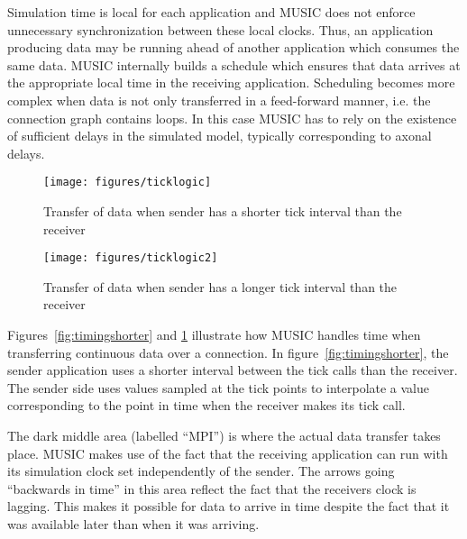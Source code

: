 \documentclass[a4paper]{report}
\begin{document}
Simulation time is local for each application
and MUSIC does not enforce unnecessary synchronization between these
local clocks.  Thus, an application producing data may be running
ahead of another application which consumes the same data.  MUSIC
internally builds a schedule which ensures that data arrives at the
appropriate local time in the receiving application.  Scheduling
becomes more complex when data is not only transferred in a
feed-forward manner, i.e. the connection graph contains loops.  In
this case MUSIC has to rely on the existence of sufficient delays in
the simulated model, typically corresponding to axonal
delays.

\begin{figure}
  \begin{center}
    \begin{minipage}{0.45\textwidth}
      \texttt{[image: figures/ticklogic]}
      \caption[Timing of data transfer, slowdown]{\label{fig:timingshorter}
        Transfer of data when sender has a shorter
        tick interval than the receiver}
    \end{minipage}
    \hfill
    \begin{minipage}{0.45\textwidth}
      \texttt{[image: figures/ticklogic2]}
      \caption[Timing of data transfer, speedup]{\label{fig:timinglonger}
        Transfer of data when sender has a longer
        tick interval than the receiver}
    \end{minipage}
  \end{center}
\end{figure}

Figures~\ref{fig:timingshorter} and \ref{fig:timinglonger} illustrate
how MUSIC handles time when transferring continuous data over a connection.
In figure~\ref{fig:timingshorter}, the sender application uses a
shorter interval between the tick calls than the receiver.  The sender
side uses values sampled at the tick points to interpolate a value
corresponding to the point in time when the receiver makes its tick
call.

The dark middle area (labelled ``MPI'') is where the actual data
transfer takes place.  MUSIC makes use of the fact that the receiving
application can run with its simulation clock set independently of the
sender.  The arrows going ``backwards in time'' in this area reflect
the fact that the receivers clock is lagging.  This makes it possible
for data to arrive in time despite the fact that it was available
later than when it was arriving.
\end{document}
